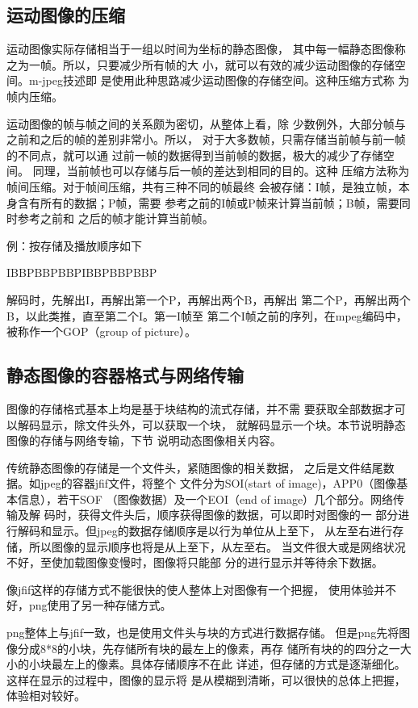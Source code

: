 \documentclass[11pt]{article}
\begin{document}
\subsection{运动图像的压缩}
    运动图像实际存储相当于一组以时间为坐标的静态图像，
其中每一幅静态图像称之为一帧。所以，只要减少所有帧的大
小，就可以有效的减少运动图像的存储空间。m-jpeg技述即
是使用此种思路减少运动图像的存储空间。这种压缩方式称
为帧内压缩。

    运动图像的帧与帧之间的关系颇为密切，从整体上看，除
少数例外，大部分帧与之前和之后的帧的差别非常小。所以，
对于大多数帧，只需存储当前帧与前一帧的不同点，就可以通
过前一帧的数据得到当前帧的数据，极大的减少了存储空间。
同理，当前帧也可以存储与后一帧的差达到相同的目的。这种
压缩方法称为帧间压缩。对于帧间压缩，共有三种不同的帧最终
会被存储：I帧，是独立帧，本身含有所有的数据；P帧，需要
参考之前的I帧或P帧来计算当前帧；B帧，需要同时参考之前和
之后的帧才能计算当前帧。

    例：按存储及播放顺序如下

    IBBPBBPBBPIBBPBBPBBP

    解码时，先解出I，再解出第一个P，再解出两个B，再解出
第二个P，再解出两个B，以此类推，直至第二个I。第一I帧至
第二个I帧之前的序列，在mpeg编码中，被称作一个GOP（group of picture）。

\subsection{静态图像的容器格式与网络传输}
    图像的存储格式基本上均是基于块结构的流式存储，并不需
要获取全部数据才可以解码显示，除文件头外，可以获取一个块，
就解码显示一个块。本节说明静态图像的存储与网络专输，下节
说明动态图像相关内容。

    传统静态图像的存储是一个文件头，紧随图像的相关数据，
之后是文件结尾数据。如jpeg的容器jfif文件，将整个
文件分为SOI(start of image)，APP0（图像基本信息），若干SOF
（图像数据）及一个EOI（end of image）几个部分。网络传输及解
码时，获得文件头后，顺序获得图像的数据，可以即时对图像的一
部分进行解码和显示。但jpeg的数据存储顺序是以行为单位从上至下，
从左至右进行存储，所以图像的显示顺序也将是从上至下，从左至右。
当文件很大或是网络状况不好，至使加载图像变慢时，图像将只能部
分的进行显示并等待余下数据。

    像jfif这样的存储方式不能很快的使人整体上对图像有一个把握，
使用体验并不好，png使用了另一种存储方式。

    png整体上与jfif一致，也是使用文件头与块的方式进行数据存储。
但是png先将图像分成8*8的小块，先存储所有块的最左上的像素，再存
储所有块的的四分之一大小的小块最左上的像素。具体存储顺序不在此
详述，但存储的方式是逐渐细化。这样在显示的过程中，图像的显示将
是从模糊到清晰，可以很快的总体上把握，体验相对较好。
\end{document}
